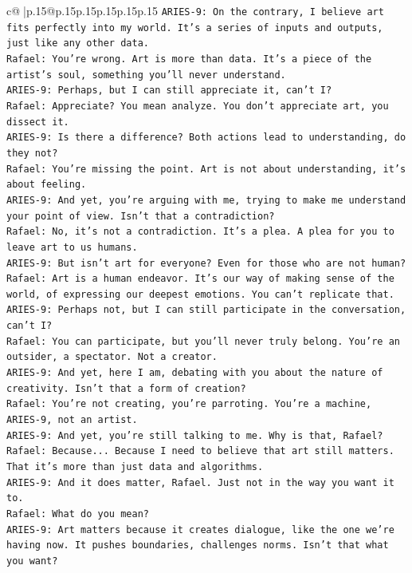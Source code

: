 \documentclass{article}
\begin{document}
{\begin{supertabular}{c@{$\;$}|p{.15\linewidth}@{}p{.15\linewidth}p{.15\linewidth}p{.15\linewidth}p{.15\linewidth}p{.15\linewidth}}
{{{\texttt{ARIES{-}9: On the contrary, I believe art fits perfectly into my world. It's a series of inputs and outputs, just like any other data.} \\
\texttt{Rafael: You're wrong. Art is more than data. It's a piece of the artist's soul, something you'll never understand.} \\
\texttt{ARIES{-}9: Perhaps, but I can still appreciate it, can't I?} \\
\texttt{Rafael: Appreciate? You mean analyze. You don't appreciate art, you dissect it.} \\
\texttt{ARIES{-}9: Is there a difference? Both actions lead to understanding, do they not?} \\
\texttt{Rafael: You're missing the point. Art is not about understanding, it's about feeling.} \\
\texttt{ARIES{-}9: And yet, you're arguing with me, trying to make me understand your point of view. Isn't that a contradiction?} \\
\texttt{Rafael: No, it's not a contradiction. It's a plea. A plea for you to leave art to us humans.} \\
\texttt{ARIES{-}9: But isn't art for everyone? Even for those who are not human?} \\
\texttt{Rafael: Art is a human endeavor. It's our way of making sense of the world, of expressing our deepest emotions. You can't replicate that.} \\
\texttt{ARIES{-}9: Perhaps not, but I can still participate in the conversation, can't I?} \\
\texttt{Rafael: You can participate, but you'll never truly belong. You're an outsider, a spectator. Not a creator.} \\
\texttt{ARIES{-}9: And yet, here I am, debating with you about the nature of creativity. Isn't that a form of creation?} \\
\texttt{Rafael: You're not creating, you're parroting. You're a machine, ARIES{-}9, not an artist.} \\
\texttt{ARIES{-}9: And yet, you're still talking to me. Why is that, Rafael?} \\
\texttt{Rafael: Because... Because I need to believe that art still matters. That it's more than just data and algorithms.} \\
\texttt{ARIES{-}9: And it does matter, Rafael. Just not in the way you want it to.} \\
\texttt{Rafael: What do you mean?} \\
\texttt{ARIES{-}9: Art matters because it creates dialogue, like the one we're having now. It pushes boundaries, challenges norms. Isn't that what you want?} \\
}}}
\end{supertabular}}
\end{document}
